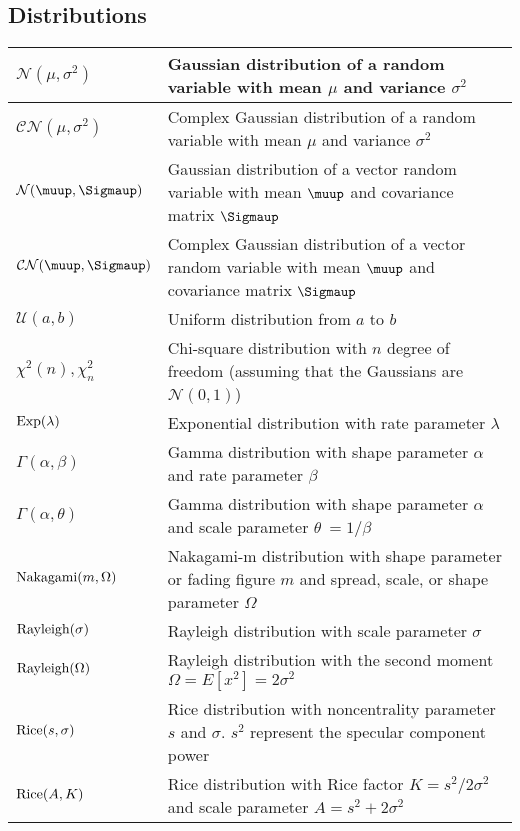 \documentclass{article}
\begin{document}
\subsection{Distributions}
\begin{xltabular}{\textwidth}{XX}
    \(\mathcal{N}(\mu, \sigma^2)\)                                & Gaussian distribution of a random variable with mean \(\mu\) and variance \(\sigma^{2}\) \\ \hline
    \(\mathcal{CN}(\mu, \sigma^2)\)                               & Complex Gaussian distribution of a random variable with mean \(\mu\) and variance \(\sigma^{2}\) \\ \hline
    \(\mathcal{N}(\boldsymbol{\muup}, \boldsymbol{\Sigmaup})\)    & Gaussian distribution of a vector random variable with mean \(\boldsymbol{\muup}\) and covariance matrix \(\boldsymbol{\Sigmaup}\)\\ \hline
    \(\mathcal{CN}(\boldsymbol{\muup}, \boldsymbol{\Sigmaup})\)   & Complex Gaussian distribution of a vector random variable with mean \(\boldsymbol{\muup}\) and covariance matrix \(\boldsymbol{\Sigmaup}\)\\ \hline
    \(\mathcal{U}(a,b)\)                                          & Uniform distribution from \(a\) to \(b\)\\ \hline
    \(\chi^2 (n), \chi^2_n\)                                      & Chi-square distribution with \(n\) degree of freedom (assuming that the Gaussians are \(\mathcal{N}(0,1)\))\\ \hline
    \(\textnormal{Exp}(\lambda)\)                                 & Exponential distribution with rate parameter \(\lambda\)\\ \hline
    \(\Gamma(\alpha, \beta)\)                                     & Gamma distribution with shape parameter \(\alpha\) and rate parameter \(\beta\)\\ \hline
    \(\Gamma(\alpha, \theta)\)                                    & Gamma distribution with shape parameter \(\alpha\) and scale parameter \(\theta\ = 1/\beta\)\\ \hline
    \(\textnormal{Nakagami}(m, \Omega)\)                          & Nakagami-m distribution with shape parameter or fading figure \(m\) and spread, scale, or shape parameter \(\Omega\) \\ \hline
    \(\textnormal{Rayleigh}(\sigma)\)                             & Rayleigh distribution with scale parameter \(\sigma\)\\ \hline
    \(\textnormal{Rayleigh}(\Omega)\)                             & Rayleigh distribution with the second moment \(\Omega = E\left[ x^2 \right] = 2\sigma^2\)\\ \hline
    \(\textnormal{Rice}(s, \sigma)\)                              & Rice distribution with noncentrality parameter \(s\) and \(\sigma\). \(s^2\) represent the specular component power\\ \hline
    \(\textnormal{Rice}(A, K)\)                                   & Rice distribution with Rice factor \(K=s^2/2\sigma^2\) and scale parameter \(A = s^2 + 2\sigma^2\)
\end{xltabular}
\end{document}
